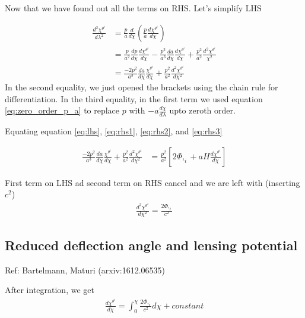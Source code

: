 \documentclass[12pt]{article}
\newcommand{\beqa}{\begin{eqnarray}}
\newcommand{\eeqa}{\end{eqnarray}}
\numberwithin{equation}{section}
\begin{document}
Now that we have found out all the terms on RHS. Let's simplify LHS

\begin{equation}
\begin{aligned}
\frac{d^2\chi^{\theta^i}}{d\lambda^2}  &= \frac{p}{a} \frac{d}{d\chi}\left( \frac{p}{a}  \frac{d\chi^{\theta^i}}{d\chi}\right) \\ 
&= \frac{p}{a^2}\frac{dp}{d\chi}\frac{d\chi^{\theta^i}}{d\chi} - \frac{p^2}{a^3}\frac{da}{d\chi} \frac{d\chi^{\theta^i}}{d\chi} + \frac{p^2}{a^2}\frac{d^2 \chi^{\theta^i}}{\chi^2} \\
&= \frac{-2p^2}{a^3} \frac{da}{d\chi} \frac{\chi^{\theta^i}}{d\chi} + \frac{p^2}{a^2} \frac{d^2 \chi^{\theta^i}}{d \chi^2}
\label{eq:lhs}
\end{aligned}
\end{equation}
In the second equality, we just opened the brackets using the chain rule for differentiation. In the third equality, in the first term we used equation \ref{eq:zero_order_p_a} to replace $p$ with $-a \frac{d\chi}{d\lambda}$ upto zeroth order.

Equating equation \ref{eq:lhs}, \ref{eq:rhs1}, \ref{eq:rhs2}, and \ref{eq:rhs3}

\begin{equation}
\begin{aligned}
\frac{-2p^2}{a^3} \frac{da}{d\chi} \frac{\chi^{\theta^i}}{d\chi} + \frac{p^2}{a^2} \frac{d^2 \chi^{\theta^i}}{d \chi^2} &= \frac{p^2}{a^2}\left[ 2\Phi,_i + aH \frac{d\chi^{\theta^i}}{d\chi} \right]
\end{aligned}
\end{equation}

First term on LHS ad second term on RHS cancel and we are left with (inserting $c^2$)
\beqa
\frac{d^2\chi^{\theta^i}}{d\chi^2} = \frac{2 \Phi,_i}{c^2}
\eeqa

\subsection{Reduced deflection angle and lensing potential}
\begin{center}
Ref: Bartelmann, Maturi (arxiv:1612.06535)
\end{center}
After integration, we get
\begin{equation}
\begin{aligned}
\frac{d\chi^{\theta^i}}{d\chi} = \int_{0}^{\chi}\frac{2\Phi,_i}{c^2} d\chi + constant
\end{aligned}
\end{equation}
\end{document}
